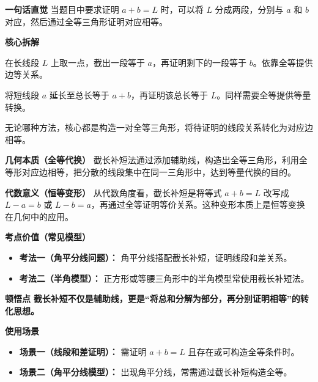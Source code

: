 \begin{explanationbox}
	\textbf{\textcolor{CExplanation}{一句话直觉}}
	当题目中要求证明 $a+b=L$ 时，可以将 $L$ 分成两段，分别与 $a$ 和 $b$ 对应，然后通过全等三角形证明对应相等。

	\medskip
	\textbf{\textcolor{CExplanation}{核心拆解}}
	\begin{description}[style=nextline, leftmargin=2.8em, labelsep=0.5em, itemsep=0.45em]
		\item[\textbf{要点一（截长法操作）：}]
			在长线段 $L$ 上取一点，截出一段等于 $a$，再证明剩下的一段等于 $b$。依靠全等提供边等关系。
		\item[\textbf{要点二（补短法操作）：}]
			将短线段 $a$ 延长至总长等于 $a+b$，再证明该总长等于 $L$。同样需要全等提供等量转换。
		\item[\textbf{要点三（全等是关键）：}]
			无论哪种方法，核心都是构造一对全等三角形，将待证明的线段关系转化为对应边相等。
	\end{description}

	\medskip
	\textbf{\textcolor{CExplanation}{几何本质（全等代换）}}
	截长补短法通过添加辅助线，构造出全等三角形，利用全等形对应边相等，把分散的线段集中在同一三角形中，达到等量代换的目的。

	\medskip
	\textbf{\textcolor{CExplanation}{代数意义（恒等变形）}}
	从代数角度看，截长补短是将等式 $a+b=L$ 改写成 $L-a=b$ 或 $L-b=a$，再通过全等证明等价关系。这种变形本质上是恒等变换在几何中的应用。

	\medskip
	\textbf{\textcolor{CExplanation}{考点价值（常见模型）}}
	\begin{itemize}[leftmargin=*, itemsep=0.5em, topsep=0.4em]
		\item \textbf{考法一（角平分线问题）：} 角平分线搭配截长补短，证明线段和差关系。
		\item \textbf{考法二（半角模型）：} 正方形或等腰三角形中的半角模型常使用截长补短法。
	\end{itemize}

	\medskip
	\textbf{\textcolor{CExplanation}{顿悟点}}
	\textbf{截长补短不仅是辅助线，更是“将总和分解为部分，再分别证明相等”的转化思想。}

	\medskip
	\textbf{\textcolor{CExplanation}{使用场景}}
	\begin{itemize}[leftmargin=*, itemsep=0.5em, topsep=0.4em]
		\item \textbf{场景一（线段和差证明）：} 需证明 $a+b=L$ 且存在或可构造全等条件时。
		\item \textbf{场景二（角平分线模型）：} 出现角平分线，常需通过截长补短构造全等。
	\end{itemize}

\end{explanationbox}

